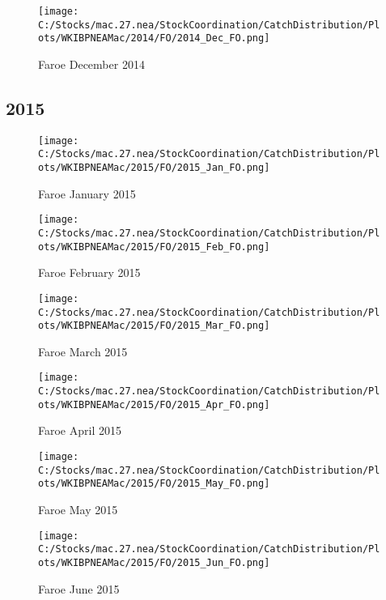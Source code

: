 \documentclass{article}
\begin{document}
\begin{figure}
	\centering
		\texttt{[image: C:/Stocks/mac.27.nea/StockCoordination/CatchDistribution/Plots/WKIBPNEAMac/2014/FO/2014\_Dec\_FO.png]}
	\caption{Faroe December 2014}
	\label{fig:2014_Dec_FO}
\end{figure}

\clearpage

\newpage

\subsection{2015}



\begin{figure}[h]
	\centering
		\texttt{[image: C:/Stocks/mac.27.nea/StockCoordination/CatchDistribution/Plots/WKIBPNEAMac/2015/FO/2015\_Jan\_FO.png]}
	\caption{Faroe January 2015}
	\label{fig:2015_Jan_FO}
\end{figure}

\begin{figure}
	\centering
		\texttt{[image: C:/Stocks/mac.27.nea/StockCoordination/CatchDistribution/Plots/WKIBPNEAMac/2015/FO/2015\_Feb\_FO.png]}
	\caption{Faroe February 2015}
	\label{fig:2015_Feb_FO}
\end{figure}

\begin{figure}
	\centering
		\texttt{[image: C:/Stocks/mac.27.nea/StockCoordination/CatchDistribution/Plots/WKIBPNEAMac/2015/FO/2015\_Mar\_FO.png]}
	\caption{Faroe March 2015}
	\label{fig:2015_Mar_FO}
\end{figure}

\begin{figure}
	\centering
		\texttt{[image: C:/Stocks/mac.27.nea/StockCoordination/CatchDistribution/Plots/WKIBPNEAMac/2015/FO/2015\_Apr\_FO.png]}
	\caption{Faroe April 2015}
	\label{fig:2015_Apr_FO}
\end{figure}

\begin{figure}
	\centering
		\texttt{[image: C:/Stocks/mac.27.nea/StockCoordination/CatchDistribution/Plots/WKIBPNEAMac/2015/FO/2015\_May\_FO.png]}
	\caption{Faroe May 2015}
	\label{fig:2015_May_FO}
\end{figure}

\begin{figure}
	\centering
		\texttt{[image: C:/Stocks/mac.27.nea/StockCoordination/CatchDistribution/Plots/WKIBPNEAMac/2015/FO/2015\_Jun\_FO.png]}
	\caption{Faroe June 2015}
	\label{fig:2015_Jun_FO}
\end{figure}
\end{document}
